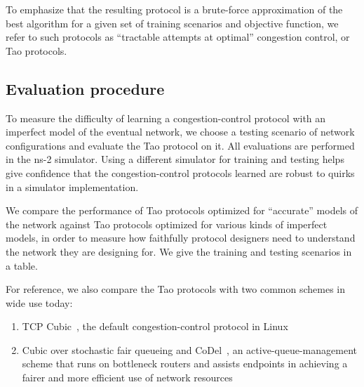 To emphasize that the resulting protocol is a brute-force
approximation of the best algorithm for a given set of training
scenarios and objective function, we refer to such protocols as
``tractable attempts at optimal'' congestion control, or Tao
protocols.

\subsection{Evaluation procedure}
\label{ss:eval}
To measure the difficulty of learning a congestion-control protocol
with an imperfect model of the eventual network, we choose a testing
scenario of network configurations and evaluate the Tao protocol on
it. All evaluations are performed in the ns-2
simulator. Using a different simulator for training and
testing helps give confidence that the congestion-control protocols
learned are robust to quirks in a simulator implementation.

We compare the performance of Tao protocols optimized for ``accurate''
models of the network against Tao protocols optimized for various
kinds of imperfect models, in order to measure how faithfully protocol
designers need to understand the network they are designing for. We
give the training and testing scenarios in a table.

For reference, we also compare the Tao protocols with two common schemes in wide use today:

\begin{enumerate}
\item TCP Cubic~\cite{cubic}, the default congestion-control protocol in Linux
\item Cubic over stochastic fair queueing and CoDel~\cite{CoDel}, an
  active-queue-management scheme that runs on bottleneck routers and
  assists endpoints in achieving a fairer and more efficient use of
  network resources
\end{enumerate}

